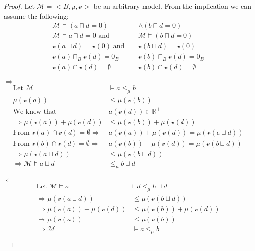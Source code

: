 \documentclass{article}
\begin{document}
\begin{proof}
Let $\mathcal{M} = <B, \mu, \mathscr{v}>$ be an arbitrary model. From the implication we can assume the following:
	\begin{align*}
		\mathcal{M} \models (a \sqcap d = 0) &\land (b \sqcap d = 0) \\
		\mathcal{M} \models a \sqcap d = 0 \text{ and }& \mathcal{M} \models (b \sqcap d = 0) \\
		\mathscr{v}(a \sqcap d) = \mathscr{v}(0) \text{ and }& \mathscr{v}(b \sqcap d) = \mathscr{v}(0) \\ 
		\mathscr{v}(a) \sqcap_B \mathscr{v}(d) = 0_B  \;\;\;\;\;\;\;& \mathscr{v}(b) \sqcap_B \mathscr{v}(d) = 0_B  \\
		\mathscr{v}(a) \cap \mathscr{v}(d) = \emptyset  \;\;\;\;\;\;\;& \mathscr{v}(b) \cap \mathscr{v}(d) = \emptyset
	\end{align*}

$\Longrightarrow$
	\begin{align*} 
		\text{Let } \mathcal{M} &\models  a \le_\mu b \\
		\mu(\mathscr{v}(a)) &\le \mu(\mathscr{v}(b)) \\
		\text{We know that } & \mu(\mathscr{v}(d)) \in \mathbb{R}^+ \\
		\Rightarrow \mu(\mathscr{v}(a)) +  \mu(\mathscr{v}(d)) &\le \mu(\mathscr{v}(b)) +  \mu(\mathscr{v}(d)) \\
		\text{From } \mathscr{v}(a) \cap \mathscr{v}(d) = \emptyset \Rightarrow & \mu(\mathscr{v}(a)) +  \mu(\mathscr{v}(d)) = \mu(\mathscr{v}(a \sqcup d)) \\
		\text{From } \mathscr{v}(b) \cap \mathscr{v}(d) = \emptyset \Rightarrow & \mu(\mathscr{v}(b)) +  \mu(\mathscr{v}(d)) = \mu(\mathscr{v}(b \sqcup d)) \\
		\Rightarrow \mu(\mathscr{v}(a \sqcup d)) &\le \mu(\mathscr{v}(b \sqcup d)) \\
		\Rightarrow \mathcal{M} \models  a \sqcup d &\le_\mu b \sqcup d
	\end{align*}

$\Longleftarrow$
	\begin{align*} 
		\text{Let } \mathcal{M} \models  a &\sqcup d \le_\mu b \sqcup d \\
		\Rightarrow \mu(\mathscr{v}(a \sqcup d)) &\le \mu(\mathscr{v}(b \sqcup d)) \\
		\Rightarrow \mu(\mathscr{v}(a)) +  \mu(\mathscr{v}(d)) &\le \mu(\mathscr{v}(b)) +  \mu(\mathscr{v}(d)) \\
		\Rightarrow \mu(\mathscr{v}(a)) &\le \mu(\mathscr{v}(b)) \\
		\Rightarrow \mathcal{M} &\models  a \le_\mu b \\
	\end{align*}
\end{proof}
\end{document}
